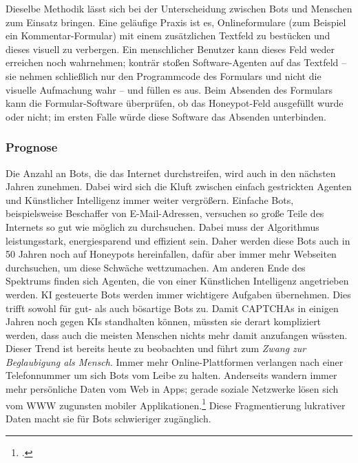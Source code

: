 Dieselbe Methodik lässt sich bei der Unterscheidung zwischen Bots und Menschen
zum Einsatz bringen. Eine geläufige Praxis ist es, Onlineformulare (zum
Beispiel ein Kommentar-Formular) mit einem zusätzlichen Textfeld zu bestücken
und dieses visuell zu verbergen. Ein menschlicher Benutzer kann dieses Feld
weder erreichen noch wahrnehmen; konträr stoßen Software-Agenten auf das
Textfeld -- sie nehmen schließlich nur den Programmcode des Formulars und nicht
die visuelle Aufmachung wahr -- und füllen es aus. Beim Absenden des Formulars
kann die Formular-Software überprüfen, ob das Honeypot-Feld ausgefüllt wurde
oder nicht; im ersten Falle würde diese Software das Absenden unterbinden.

\subsubsection{Prognose}
\label{ssub:prognose}

Die Anzahl an Bots, die das Internet durchstreifen, wird auch in den nächsten
Jahren zunehmen. Dabei wird sich die Kluft zwischen einfach gestrickten Agenten
und Künstlicher Intelligenz immer weiter vergrößern. Einfache Bots,
beispielsweise Beschaffer von E-Mail-Adressen, versuchen so große Teile des
Internets so gut wie möglich zu durchsuchen. Dabei muss der Algorithmus
leistungsstark, energiesparend und effizient sein. Daher werden diese Bots auch
in 50 Jahren noch auf Honeypots hereinfallen, dafür aber immer mehr Webseiten
durchsuchen, um diese Schwäche wettzumachen. Am anderen Ende des Spektrums
finden sich Agenten, die von einer Künstlichen Intelligenz angetrieben werden.
KI gesteuerte Bots werden immer wichtigere Aufgaben übernehmen. Dies trifft
sowohl für gut- als auch bösartige Bots zu. Damit CAPTCHAs in einigen Jahren
noch gegen KIs standhalten können, müssten sie derart kompliziert werden, dass
auch die meisten Menschen nichts mehr damit anzufangen wüssten. Dieser Trend
ist bereits heute zu beobachten und führt zum \emph{Zwang zur Beglaubigung als
Mensch}. Immer mehr Online-Plattformen verlangen nach einer Telefonnummer um
sich Bots vom Leibe zu halten. Anderseits wandern immer mehr persönliche Daten
vom Web in Apps; gerade soziale Netzwerke lösen sich vom WWW zugunsten mobiler
Applikationen.\footcite{timeOnSmartphone} Diese Fragmentierung lukrativer Daten
macht sie für Bots schwieriger zugänglich.
